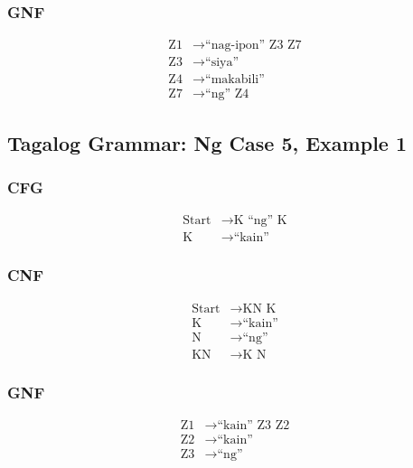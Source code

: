 \subsubsection{GNF}
\begin{equation*}
    \begin{aligned}
        \text{Z1}   & \rightarrow \text{“nag-ipon” Z3 Z7}   \\
        \text{Z3} & \rightarrow \text{“siya”} \\
        \text{Z4} & \rightarrow \text{“makabili”} \\
        \text{Z7} & \rightarrow \text{“ng” Z4}
    \end{aligned}
\end{equation*}


\newpage
\subsection{Tagalog Grammar: Ng Case 5, Example 1}
\subsubsection{CFG}
\begin{equation*}
    \begin{aligned}
        \text{Start}   & \rightarrow \text{K “ng” K}   \\
        \text{K} & \rightarrow \text{“kain”}
    \end{aligned}
\end{equation*}

\subsubsection{CNF}
\begin{equation*}
    \begin{aligned}
        \text{Start}   & \rightarrow \text{KN K}   \\
        \text{K} & \rightarrow \text{“kain”} \\
        \text{N} & \rightarrow \text{“ng”} \\
        \text{KN} & \rightarrow \text{K N}
    \end{aligned}
\end{equation*}

\subsubsection{GNF}
\begin{equation*}
    \begin{aligned}
        \text{Z1}   & \rightarrow \text{“kain” Z3 Z2}   \\
        \text{Z2} & \rightarrow \text{“kain”} \\
        \text{Z3} & \rightarrow \text{“ng”}
    \end{aligned}
\end{equation*}

